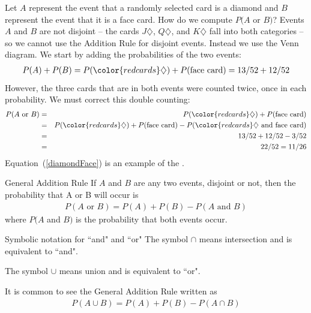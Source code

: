 Let $A$ represent the event that a randomly selected card is a diamond and $B$ represent the event that it is a face card. How do we compute $P(A$ or $B)$? Events $A$ and $B$ are not disjoint -- the cards {\color{redcards}$J\diamondsuit$}, {\color{redcards}$Q\diamondsuit$}, and {\color{redcards}$K\diamondsuit$} fall into both categories -- so we cannot use the Addition Rule for disjoint events. Instead we use the Venn diagram. We start by adding the probabilities of the two events:
\begin{eqnarray*}
P(A) + P(B) = P({\color{redcards}\diamondsuit}) + P(\text{face card}) = 13/52 + 12/52
\label{overCountFaceDiamond}
\end{eqnarray*}
However, the three cards that are in both events were counted twice, once in each probability. We must correct this double counting:
\begin{eqnarray*}
P(A\text{ or } B) &=&P({\color{redcards}\diamondsuit}) + P(\text{face card})  \notag \\
 &=& P({\color{redcards}\diamondsuit}) + P(\text{face card}) - P({\color{redcards}\diamondsuit}  \text{ and face card}) \label{diamondFace} \\
 &=& 13/52 + 12/52 - 3/52 \notag \\
 &=& 22/52 = 11/26 \notag
\end{eqnarray*}
Equation~(\ref{diamondFace}) is an example of the .

\begin{onebox}{General Addition Rule}
If $A$ and $B$ are any two events, disjoint or not, then the probability that A or B will occur is
\begin{eqnarray*}
P(A\text{ or }B) = P(A) + P(B) - P(A\text{ and }B)
\label{generalAdditionRule}
\end{eqnarray*}
where $P(A$ and $B)$ is the probability that both events occur.\end{onebox}


\begin{onebox}{Symbolic notation for ``and" and ``or"}
The symbol $\cap$ means intersection and is equivalent to ``and".

The symbol  $\cup$ means union and is equivalent to ``or".

It is common to see the General Addition Rule written as
\begin{eqnarray*}
P(A \cup B) = P(A) + P(B) - P(A \cap B)
\end{eqnarray*}
\end{onebox}


